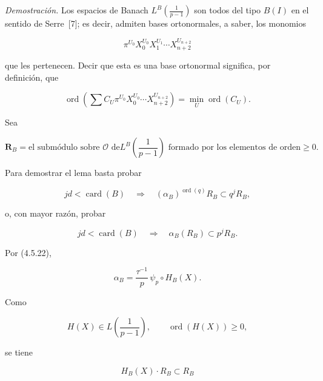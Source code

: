 \noindent\emph{Demostración.}
Los espacios de Banach $L^B\!\left(\frac1{p-1}\right)$ son todos del
tipo $B(I)$ en el sentido de Serre~[7]; es decir, admiten bases
ortonormales, a saber, los monomios

\begin{equation}\tag{4.6.9}
\pi^{U_0}X_0^{U_0}X_1^{U_1}\cdots X_{n+2}^{U_{n+2}}
\end{equation}

que les pertenecen. Decir que esta es una base ortonormal significa, por
definición, que

\begin{equation}\tag{4.6.10}
\operatorname{ord}\!\left(
\sum C_U\pi^{U_0}X_0^{U_0}\cdots X_{n+2}^{U_{n+2}}
\right)
=\min_U\operatorname{ord}(C_U).
\end{equation}

Sea

{\footnotesize\begin{equation}\tag{4.6.11}
\mathbf R_B=\text{el submódulo sobre $\mathcal O$ de
$L^B\!\left(\frac1{p-1}\right)$ formado por los elementos de orden
$\geq0$}.
\end{equation}}

Para demostrar el lema basta probar

\begin{equation}\tag{4.6.12}
jd<\operatorname{card}(B)
\quad\Longrightarrow\quad
(\alpha_B)^{\operatorname{ord}(q)}R_B\subset q^jR_B,
\end{equation}

o, con mayor razón, probar

\begin{equation}\tag{4.6.13}
jd<\operatorname{card}(B)
\quad\Longrightarrow\quad
\alpha_B(R_B)\subset p^jR_B.
\end{equation}

Por (4.5.22),

\begin{equation}\tag{4.6.14}
\alpha_B=\frac{\tau^{-1}}p\,\psi_p\circ H_B(X).
\end{equation}

Como

\begin{equation}\tag{4.6.15}
H(X)\in L\!\left(\frac1{p-1}\right),
\qquad \operatorname{ord}(H(X))\geq0,
\end{equation}

se tiene

\begin{equation}\tag{4.6.16}
H_B(X)\cdot R_B\subset R_B
\end{equation}

